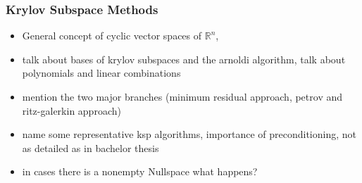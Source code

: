       \subsubsection{Krylov Subspace Methods}
        \begin{itemize}
          \item General concept of cyclic vector spaces of \(\mathbb{R}^n\), 
          \item talk about bases of krylov subspaces and the arnoldi algorithm, talk about polynomials and linear combinations
          \item mention the two major branches (minimum residual approach, petrov and ritz-galerkin approach) 
          \item name some representative ksp algorithms, importance of preconditioning, not as detailed as in bachelor thesis
          \item in cases there is a nonempty Nullspace what happens?
        \end{itemize}

